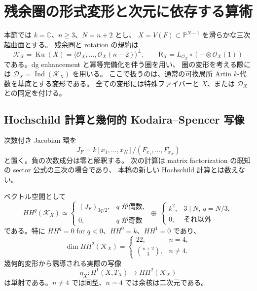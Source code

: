 \section{残余圏の形式変形と次元に依存する算術}
\label{sec:nf-residual}

本節では $k=\mathbb C$、$n\geq3$、$N=n+2$ とし、
$X=V(F)\subset\mathbb P^{N-1}$ を滑らかな三次超曲面とする。
残余圏と rotation の規約は
\[
 \mathcal K_X=\operatorname{Ku}(X)
   =\langle\mathcal O_X,\ldots,\mathcal O_X(n-2)\rangle^\perp,
 \qquad
 \mathsf R_X=L_{\mathcal O_X}\circ(-\otimes\mathcal O_X(1))
\]
である。dg enhancement と冪等完備化を伴う圏を用い、
圏の変形を考える際には
$\mathcal D_X=\operatorname{Ind}(\mathcal K_X)$ を用いる。
ここで扱うのは、通常の可換局所 Artin $k$-代数を基底とする変形である。
全ての変形には特殊ファイバーと $X$、または $\mathcal D_X$ との同定を付ける。

\subsection{Hochschild 計算と幾何的 Kodaira--Spencer 写像}

次数付き Jacobian 環を
\[
 J_F=k[x_1,\ldots,x_N]/(F_{x_1},\ldots,F_{x_N})
\]
と置く。負の次数成分は零と解釈する。
次の計算は matrix factorization の既知の sector 公式の三次の場合であり、
本稿の新しい Hochschild 計算とは数えない。

\begin{proposition}
\label{prop:nf-hh}
ベクトル空間として
\begin{equation}
\label{eq:nf-hh}
 HH^q(\mathcal K_X)\simeq
 \begin{cases}
   (J_F)_{3q/2},&q\text{ が偶数},\\
   0,&q\text{ が奇数}
 \end{cases}
 \ \oplus\
 \begin{cases}
   k^2,&3\mid N,\ q=N/3,\\
   0,&\text{それ以外}
 \end{cases}
\end{equation}
である。特に $HH^q=0$ for $q<0$、$HH^0=k$、$HH^1=0$ であり、
\[
 \dim HH^2(\mathcal K_X)=
 \begin{cases}
  22,&n=4,\\
  \binom{n+2}{3},&n\neq4.
 \end{cases}
\]
幾何的変形から誘導される実際の写像
\begin{equation}
\label{eq:nf-geometric-ks}
 \eta_X:H^1(X,T_X)\longrightarrow HH^2(\mathcal K_X)
\end{equation}
は単射である。$n\neq4$ では同型、$n=4$ では余核は二次元である。
\end{proposition}

